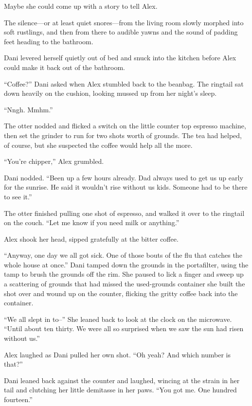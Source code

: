 Maybe she could come up with a story to tell Alex.

\secdiv{}

\noindent The silence---or at least quiet snores---from the living room slowly morphed into soft rustlings, and then from there to audible yawns and the sound of padding feet heading to the bathroom.

Dani levered herself quietly out of bed and snuck into the kitchen before Alex could make it back out of the bathroom.

``Coffee?'' Dani asked when Alex stumbled back to the beanbag. The ringtail sat down heavily on the cushion, looking mussed up from her night's sleep.

``Nngh. Mmhm.''

The otter nodded and flicked a switch on the little counter top espresso machine, then set the grinder to run for two shots worth of grounds. The tea had helped, of course, but she suspected the coffee would help all the more.

``You're chipper,'' Alex grumbled.

Dani nodded. ``Been up a few hours already. Dad always used to get us up early for the sunrise. He said it wouldn't rise without us kids. Someone had to be there to see it.''

The otter finished pulling one shot of espresso, and walked it over to the ringtail on the couch. ``Let me know if you need milk or anything.''

Alex shook her head, sipped gratefully at the bitter coffee.

``Anyway, one day we all got sick. One of those bouts of the flu that catches the whole house at once.'' Dani tamped down the grounds in the portafilter, using the tamp to brush the grounds off the rim. She paused to lick a finger and sweep up a scattering of grounds that had missed the used-grounds container she built the shot over and wound up on the counter, flicking the gritty coffee back into the container.

``We all slept in to--'' She leaned back to look at the clock on the microwave. ``Until about ten thirty. We were all so surprised when we saw the sun had risen without us.''

Alex laughed as Dani pulled her own shot. ``Oh yeah? And which number is that?''

Dani leaned back against the counter and laughed, wincing at the strain in her tail and clutching her little demitasse in her paws. ``You got me. One hundred fourteen.''

